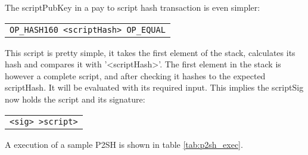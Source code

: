 The scriptPubKey in a pay to script hash transaction is even simpler:
\begin{center}
	\begin{tabular}{|c|}
		\texttt{OP\_HASH160 <scriptHash> OP\_EQUAL}
	\end{tabular}
\end{center}
This script is pretty simple, it takes the first element of the stack,
  calculates its hash and compares it with '<scriptHash>'. The first
  element in the stack is however a complete script, and after checking
  it hashes to the expected scriptHash. It will be evaluated with its
  required input. This implies the scriptSig now holds the script and
  its signature:

\begin{center}
	\begin{tabular}{|c|}
		\texttt{<sig> >script>}
	\end{tabular}
\end{center}


  A execution of a sample P2SH is shown in table \ref{tab:p2sh_exec}.

